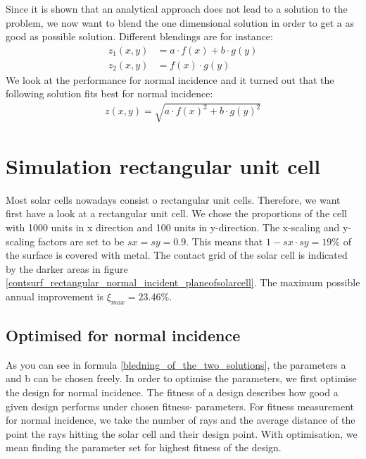 Since it is shown that an analytical approach does not lead to a solution to the problem, we now want to blend the one dimensional solution in order to get a as good as possible solution. Different blendings are for instance:
\begin{align*}
z_1(x,y) &= a \cdot f(x) + b \cdot g(y) \\
z_2(x,y) &= f(x) \cdot g(y)
\end{align*}
We look at the performance for normal incidence and it turned out that the following solution fits best for normal incidence:
\begin{align}
z(x,y)= \sqrt{a \cdot  f(x)^2+b \cdot g(y)^2} \label{bledning_of_the_two_solutions}
\end{align}

\section{Simulation rectangular unit cell \label{SECTION_Simulation_rectangular_unit_cell}}
Most solar cells nowadays consist o rectangular unit cells. Therefore, we want first have a look at a rectangular unit cell. We chose the proportions of the cell with 1000 units in x direction and 100 units in y-direction. The x-scaling and y-scaling factors are set to be $sx=sy=0.9$. This means that $1-sx \cdot sy=19 $\% of the surface is covered with metal. The contact grid of the solar cell is indicated by the darker areas in figure \ref{contsurf_rectangular_normal_incident_planeofsolarcell}. The maximum possible annual improvement is $\xi_{max}= 23.46 $\%. 
\subsection{Optimised for normal incidence}

As you can see in formula \ref{bledning_of_the_two_solutions}, the parameters a and b can be chosen freely. In order to optimise the parameters, we first optimise the design for normal incidence. The fitness of a design describes how good a given design performs under chosen fitness- parameters. For fitness measurement for normal incidence, we take the number of rays and the average distance of the point the rays hitting the solar cell and their design point. With optimisation, we mean finding the parameter set for highest fitness of the design. 

